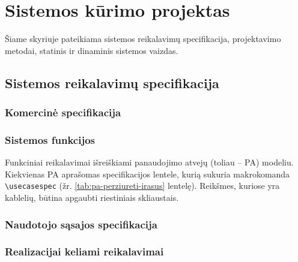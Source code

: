 \section{Sistemos kūrimo projektas}

Šiame skyriuje pateikiama sistemos reikalavimų specifikacija, projektavimo metodai, statinis ir dinaminis sistemos vaizdas.

\subsection{Sistemos reikalavimų specifikacija}

\subsubsection{Komercinė specifikacija}

\lipsum[1]

\subsubsection{Sistemos funkcijos}

Funkciniai reikalavimai išreiškiami panaudojimo atvejų (toliau -- PA) modeliu. Kiekvienas PA aprašomas specifikacijos lentele, kurią sukuria makrokomanda \verb|\usecasespec| (žr. \ref{tab:pa-perziureti-irasus} lentelę). Reikšmes, kuriose yra kablelių, būtina apgaubti riestiniais skliaustais.


\subsubsection{Naudotojo sąsajos specifikacija}

\lipsum[2]

\subsubsection{Realizacijai keliami reikalavimai}

\lipsum[3]

